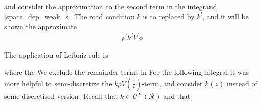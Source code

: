 and consider the approximation to the second term in the integrand \eqref{space_dep_weak_s}. The road condition $k$ is to replaced by $k^l$, and it will be shown the approximate 
\begin{align}
    \rho^l k^l V^l \phi 
\end{align}    

 The application of Leibniz rule is 


where the 
We exclude the remainder terms in 
For the following integral it was more helpful to semi-discretize the $k\rho V(\frac{1}{\rho})$-term, and consider $k(z)$ instead of some discretised version. Recall that $k \in \mathscr{C}^{\infty}(\mathscr{R})$ and that 


